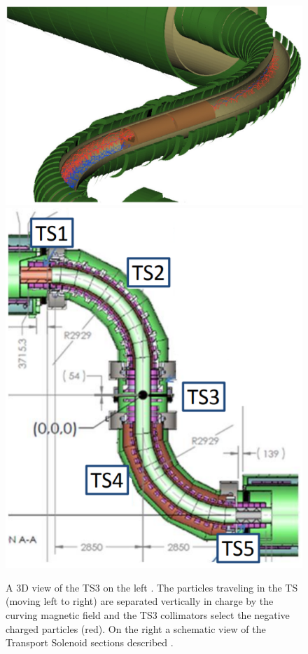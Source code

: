 \documentclass[12pt,a4paper,openright, oneside, titlepage]{book} %
\begin{document}
\begin{figure}[h!]
\centering
\includegraphics[scale=0.5]{MuonBeamline_TS_window_2} \hfill
\includegraphics[scale=0.48]{MuonBeamline_TS_3}
\caption{A 3D view of the TS3 on the left \cite{bob_mu2e}. The particles traveling in the TS (moving left to right) are separated vertically in charge by the curving magnetic field and the TS3 collimators select the negative charged particles (red). 
On the right a schematic view of the Transport Solenoid sections described \cite{TS}.}
\label{_TS3}
\end{figure}
\end{document}

